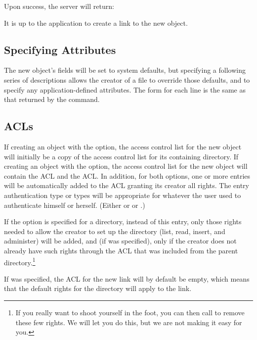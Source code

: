 Upon success, the server will return:
\begin{command}
  
\end{command}
It is up to the application to create a link to the new object.  

\subsection{Specifying Attributes}

The new object's fields will be set to system defaults, but
specifying a following series of  descriptions allows
the creator of a file to override those defaults, and to specify any
application-defined attributes.  The form for each  line is
the same as that returned by the
 command.

\subsection{ACLs}

If creating an object with the  option, the access
control list for the new object will initially be a copy of the access control
list for its containing directory.  If creating an object with the
 option, the access control list for the new object will
contain the  ACL and the  ACL.
In addition,
for both options, one or more entries will be automatically added to the ACL
granting its creator all rights.  The entry authentication type or types
will be appropriate for whatever the user used to authenticate himself
or herself.  (Either   or  or
.)

If the  option is
specified for a directory, instead of this entry, only those rights needed to 
allow the creator to set up the directory (list, read, insert, and
administer) will be added, and (if  was specified), only
if the creator does not already have such rights through the ACL that
was included from the parent directory.\footnote{If you really want to shoot yourself in the foot, you can
then call  to remove these few rights.  We will let you
do this, but we are not making it easy for you.} 

If  was specified, the ACL for the new link will
by default be empty, which means that the default rights for the
directory will apply to the link.

